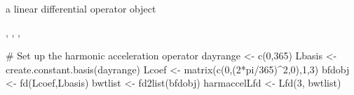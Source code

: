 \begin{Value}
a linear differential operator object
\end{Value}
\begin{SeeAlso}\relax
{}, 
, 
, 
\end{SeeAlso}
\begin{Examples}
\begin{ExampleCode}
#  Set up the harmonic acceleration operator
dayrange  <- c(0,365)
Lbasis  <- create.constant.basis(dayrange)
Lcoef   <- matrix(c(0,(2*pi/365)^2,0),1,3)
bfdobj  <- fd(Lcoef,Lbasis)
bwtlist <- fd2list(bfdobj)
harmaccelLfd <- Lfd(3, bwtlist)
\end{ExampleCode}
\end{Examples}

